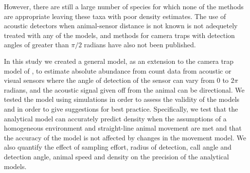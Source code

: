 \documentclass[a4paper,10pt,reqno,oneside]{amsart}
\begin{document}
However, there are still a large number of species for which none of the methods are appropriate leaving these taxa with poor density estimates. The use of acoustic detectors when animal-sensor distance is not known is not adequetely treated with any of the models, and methods for camera traps with detection angles of greater than $\pi/2$ radians have also not been published.


In this study we created a general model, as an extension to the camera trap model of \citep{rowcliffe2008estimating}, to estimate absolute abundance from count data from acoustic or visual sensors  where the angle of detection of the sensor can vary from 0 to $2\pi$ radians, and the acoustic signal given off from the animal can be directional. We tested the model using simulations in order to assess the validity of the models and in order to give suggestions for best practice. Specifically, we test that the analytical model can accurately predict density when the assumptions of a homogeneous environment and straight-line animal movement are met and that the accuracy of the model is not affected by changes in the movement model. We also quantify the effect of sampling effort, radius of detection, call angle and detection angle, animal speed and density on the precision of the analytical models.
\end{document}
